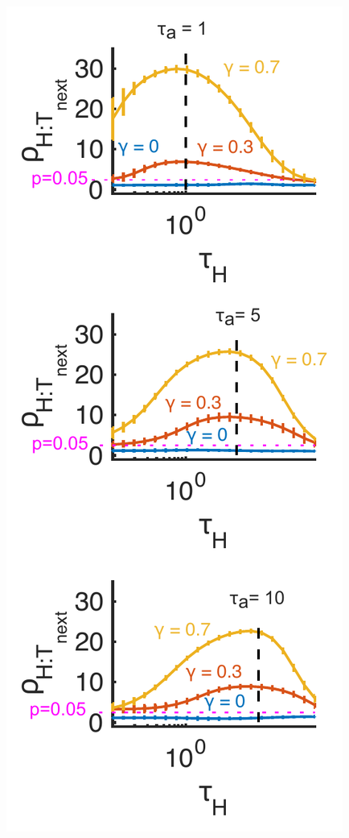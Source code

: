 \begin{figure}
	\centering
	\includegraphics[scale=0.65]{ch3Figs/rho_vs_tau_sim_edit.pdf}

\end{figure}
